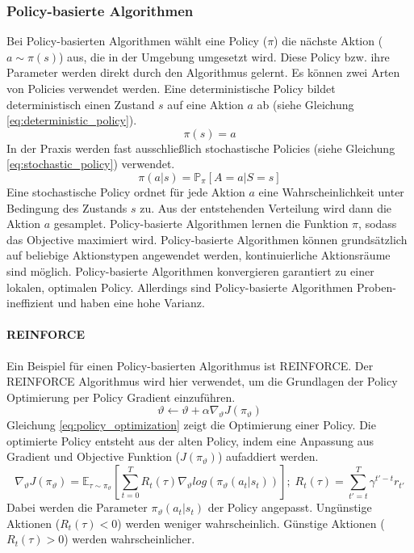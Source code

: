 \subsubsection{Policy-basierte Algorithmen}\label{sec:policy_gradient}
Bei Policy-basierten Algorithmen wählt eine Policy ($\pi$) die nächste Aktion ($a \sim \pi(s)$) aus, die in der Umgebung umgesetzt wird. Diese Policy bzw. ihre Parameter werden direkt durch den Algorithmus gelernt. Es können zwei Arten von Policies verwendet werden. Eine deterministische Policy bildet deterministisch einen Zustand $s$ auf eine Aktion $a$ ab (siehe Gleichung \ref{eq:deterministic_policy}). \cite{FoundationsDeepRL}
\begin{equation}
    \pi(s) = a
    \label{eq:deterministic_policy}
\end{equation}
In der Praxis werden fast ausschließlich stochastische Policies (siehe Gleichung \ref{eq:stochastic_policy}) verwendet.
\begin{equation}
    \pi(a\vert s) = \mathbb{P}_{\pi}\left[ A=a \vert S=s \right]
    \label{eq:stochastic_policy}
\end{equation}
Eine stochastische Policy ordnet für jede Aktion $a$ eine Wahrscheinlichkeit unter Bedingung des Zustands $s$ zu. Aus der entstehenden Verteilung wird dann die Aktion $a$ gesamplet. Policy-basierte Algorithmen lernen die Funktion $\pi$, sodass das Objective maximiert wird.
Policy-basierte Algorithmen können grundsätzlich auf beliebige Aktionstypen angewendet werden, kontinuierliche Aktionsräume sind möglich. Policy-basierte Algorithmen konvergieren garantiert zu einer lokalen, optimalen Policy. Allerdings sind Policy-basierte Algorithmen Proben-ineffizient und haben eine hohe Varianz. \cite{deepRL-2020}

\paragraph{REINFORCE}
Ein Beispiel für einen Policy-basierten Algorithmus ist REINFORCE. Der REINFORCE Algorithmus wird hier verwendet, um die Grundlagen der Policy Optimierung per Policy Gradient einzuführen.
\begin{equation}
    \vartheta \leftarrow \vartheta + \alpha \nabla_\vartheta J(\pi_\vartheta)
    \label{eq:policy_optimization}
\end{equation}
Gleichung \ref{eq:policy_optimization} zeigt die Optimierung einer Policy. Die optimierte Policy entsteht aus der alten Policy, indem eine Anpassung aus Gradient und Objective Funktion ($J(\pi_\vartheta)$) aufaddiert werden.
\begin{equation}
    \nabla_\vartheta J(\pi_\vartheta) = \mathbb{E}_{\tau\sim\pi_\vartheta} \left[ \sum_{t=0}^T R_t(\tau) \nabla_\vartheta log(\pi_\vartheta(a_t\vert s_t))\right]
    ;\; R_t(\tau) = \sum_{t'=t}^T \gamma^{t'-t} r_{t'}
    \label{eq:gradient_objective_function}
\end{equation}
Dabei werden die Parameter $\pi_\vartheta(a_t\vert s_t)$ der Policy angepasst. Ungünstige Aktionen ($R_t(\tau) < 0$) werden weniger wahrscheinlich. Günstige Aktionen ($R_t(\tau) > 0$) werden wahrscheinlicher. \cite{FoundationsDeepRL}

